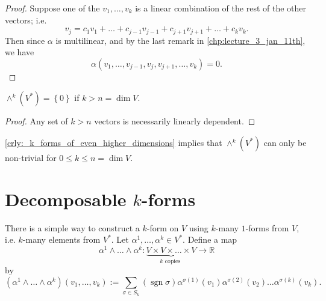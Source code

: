 \documentclass[notoc,notitlepage]{tufte-book}
\DeclareMathOperator{\sgn}{sgn}
\begin{document}
\begin{proof}
  Suppose one of the $v_1, \ldots, v_k$ is a linear combination of the rest of the
  other vectors; i.e.
  \begin{equation*}
    v_j = c_1 v_1 + \hdots + c_{j - 1} v_{j - 1} + c_{j + 1} v_{j + 1} + \hdots + c_k v_k.
  \end{equation*}
  Then since $\alpha$ is multilinear, and by the last remark in \cref{chp:lecture_3_jan_11th},
  we have
  \begin{equation*}
    \alpha (v_1, \ldots, v_{j - 1}, v_j , v_{j + 1}, \ldots, v_k) = 0.
  \end{equation*}
\end{proof}

\begin{crly}\label{crly:_k_forms_of_even_higher_dimensions}
  $\wedge^k \left( V^* \right) = \left\{ 0 \right\}$ if $k > n = \dim V$.
\end{crly}

\begin{proof}
  Any set of $k > n$ vectors is necessarily linearly dependent.
\end{proof}

\begin{note}
  \cref{crly:_k_forms_of_even_higher_dimensions} implies that $\wedge^k \left( V^* \right)$
  can only be non-trivial for $0 \leq k \leq n = \dim V$.
\end{note}


\section{Decomposable \texorpdfstring{$k$}{k}-forms}%
\label{sec:decomposable_k_forms}

There is a simple way to construct a $k$-form on $V$ using $k$-many $1$-forms from $V$, i.e.
$k$-many elements from $V^*$. Let $\alpha^1, \ldots, \alpha^k \in V^*$. Define a map
\begin{equation*}
  \alpha^1 \land \hdots \land \alpha^k : \underbrace{V \times V \times \hdots
  \times V}_{k \text{ copies }} \to \mathbb{R}
\end{equation*}
by
\begin{equation}\label{eq:defining_a_k_form}
  \left( \alpha^1 \land \hdots \land \alpha^k \right) ( v_1, \ldots, v_k )
  := \sum_{\sigma \in S_k} \left( \sgn \sigma \right) \alpha^{\sigma(1)}(v_1)
  \alpha^{\sigma(2)}(v_2) \hdots \alpha^{\sigma(k)}(v_k).
\end{equation}
\end{document}
